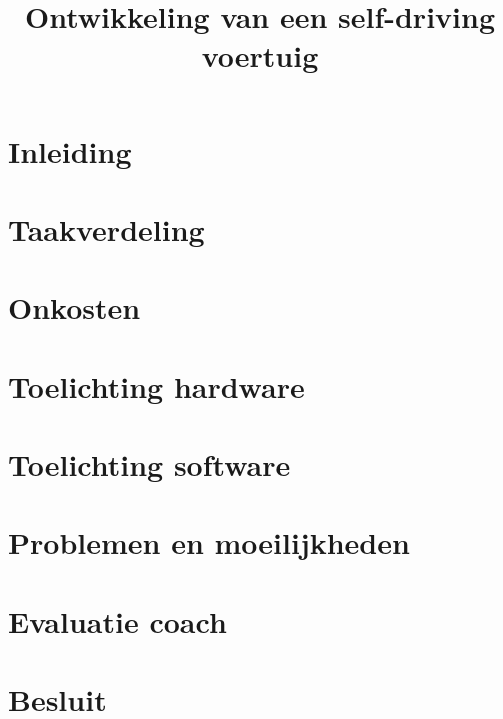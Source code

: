 \documentclass[11pt,a4paper]{report}
\title{Ontwikkeling van een self-driving voertuig}
\subtitle{}
\begin{document}
\preface
\tableofcontents

\chapter{Inleiding}

\chapter{Taakverdeling}

\chapter{Onkosten}

\chapter{Toelichting hardware}

\chapter{Toelichting software}

\chapter{Problemen en moeilijkheden}

\chapter{Evaluatie coach}

\chapter{Besluit}



\end{document}

